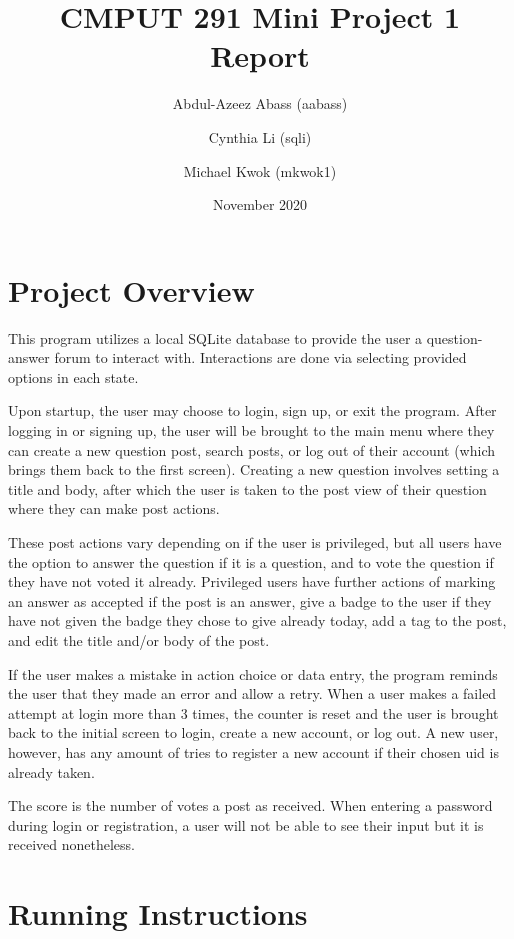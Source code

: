 \documentclass{article}
\title{CMPUT 291 Mini Project 1 Report}
\date{November 2020}
\author{Abdul-Azeez Abass (aabass)\\
\and Cynthia Li (sqli)\\
\and Michael Kwok (mkwok1)}
\begin{document}
\maketitle

\section{Project Overview}

This program utilizes a local SQLite database to provide the user a question-answer forum to interact with. Interactions are done via selecting provided options in each state.

Upon startup, the user may choose to login, sign up, or exit the program. After logging in or signing up, the user will be brought to the main menu where they can create a new question post, search posts, or log out of their account (which brings them back to the first screen). Creating a new question involves setting a title and body, after which the user is taken to the post view of their question where they can make post actions.

These post actions vary depending on if the user is privileged, but all users have the option to answer the question if it is a question, and to vote the question if they have not voted it already. Privileged users have further actions of marking an answer as accepted if the post is an answer, give a badge to the user if they have not given the badge they chose to give already today, add a tag to the post, and edit the title and/or body of the post.

If the user makes a mistake in action choice or data entry, the program reminds the user that they made an error and allow a retry. When a user makes a failed attempt at login more than 3 times, the counter is reset and the user is brought back to the initial screen to login, create a new account, or log out. A new user, however, has any amount of tries to register a new account if their chosen uid is already taken.

The score is the number of votes a post as received. When entering a password during login or registration, a user will not be able to see their input but it is received nonetheless.

\section{Running Instructions}
\end{document}
